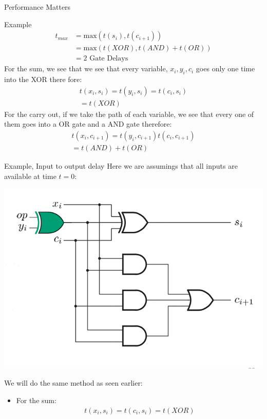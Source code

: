 \begin{parag}{Performance Matters}
\begin{subparag}{Example}
    \begin{align*}
        t_{max} &= \text{max}(t(s_i), t(c_{i+1}))\\
                &= \text{max}(t(XOR), t(AND) + t(OR)) \\
                &= 2 \text{ Gate Delays}
    \end{align*}
    For the sum, we see that we see that every variable, $x_i, y_i, c_i$ goes only one time into the XOR there fore:
    \begin{align*}
        t(x_i, s_i) = t(y_i, s_i) = t(c_i,s_i)\\
        = t(XOR)
    \end{align*}
    For the carry out, if we take the path of each variable, we see that every one of them goes into a OR gate and a AND gate therefore:
    \begin{align*}
        t(x_i, c_{i+1}) = t(y_i, c_{i+1})  t(c_i, c_{i+1}) \\
        = t(AND) + t(OR)
    \end{align*}
\end{subparag}
\begin{subparag}{Example, Input to output delay}
    Here we are assumings that all inputs are available at time $t = 0$:
    \begin{center}
        \includegraphics[scale=0.8]{12025-03-17.png}
    \end{center}
  We will do the same method as seen earlier:\\
  \begin{itemize}
      \item For the sum:
          \begin{align*}
              t(x_i, s_i) = t(c_i, s_i) = t(XOR)\\

\end{align*}
\end{itemize}
\end{subparag}
\end{parag}
